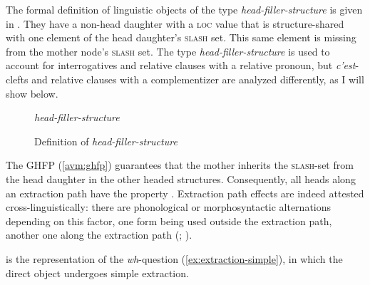 The formal definition of linguistic objects of the type \emph{head-filler-structure} is given in . They have a non-head daughter with a \textsc{loc} value that is structure-shared with one element of the head daughter's \textsc{slash} set. This same element is missing from the mother node's \textsc{slash} set. The type \emph{head-filler-structure} is used to account for interrogatives and relative clauses with a relative pronoun, but \emph{c'est}-clefts and relative clauses with a complementizer are analyzed differently, as I will show below.

\begin{figure}[ht]
\textit{head-filler-structure} \avm{$\to$} 
\caption{Definition of \emph{head-filler-structure}}
\label{avm:head-filler-structure}
\end{figure}

The GHFP (\ref{avm:ghfp}) guarantees that the mother inherits the \textsc{slash}-set from the head daughter in the other headed structures. Consequently, all heads along an extraction path have the property . Extraction path effects are indeed attested cross-linguistically: there are phonological or morphosyntactic alternations depending on this factor, one form being used outside the extraction path, another one along the extraction path (\citealt{Zaenen.1983,Hukari.1995}; \citealt[Section 3.2]{Bouma.2001}).

 is the representation of the \emph{wh}-question (\ref{ex:extraction-simple}), in which the direct object undergoes simple extraction.

\label{ex:extraction-simple}
\z 

